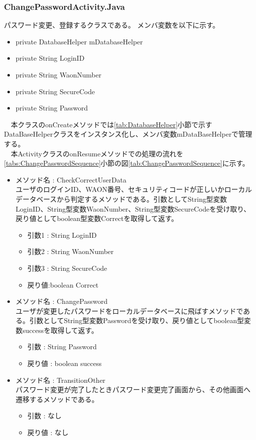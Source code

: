 \documentclass[a4j]{jarticle}
\begin{document}
\subsubsection{ChangePasswordActivity.Java}
\label{tab:ChangePassword}
パスワード変更、登録するクラスである。
メンバ変数を以下に示す。
\begin{itemize}
\item private DatabaseHelper mDatabaseHelper
\item private String LoginID
\item private String WaonNumber
\item private String SecureCode
\item private String Password
\end{itemize}
　本クラスのonCreateメソッドでは\ref{tab:DatabaseHelper}小節で示すDataBaseHelperクラスをインスタンス化し、メンバ変数mDataBaseHelperで管理する。\\
　本ActivityクラスのonResumeメソッドでの処理の流れを\ref{tabs:ChangePasswordSequence}小節の図\ref{tab:ChangePasswordSequence}に示す。
\begin{itemize}
\item メソッド名 : CheckCorrectUserData\\
  ユーザのログインID、WAON番号、セキュリティコードが正しいかローカルデータベースから判定するメソッドである。引数としてString型変数LoginID、String型変数WaonNumber、String型変数SecureCodeを受け取り、戻り値としてboolean型変数Correctを取得して返す。
  \begin{itemize}
  \item 引数1 : String LoginID
  \item 引数2 : String WaonNumber
  \item 引数3 : String SecureCode
  \item 戻り値:boolean Correct
  \end{itemize}

\item メソッド名 : ChangePassword\\
  ユーザが変更したパスワードをローカルデータベースに飛ばすメソッドである。引数としてString型変数Passwordを受け取り、戻り値としてboolean型変数successを取得して返す。
  \begin{itemize}
  \item 引数 : String Password
  \item 戻り値 : boolean success
  \end{itemize}

\item メソッド名 : TransitionOther\\
  パスワード変更が完了したときパスワード変更完了画面から、その他画面へ遷移するメソッドである。
  \begin{itemize}
  \item 引数 : なし
  \item 戻り値 : なし
  \end{itemize}
\end{itemize}
\end{document}
